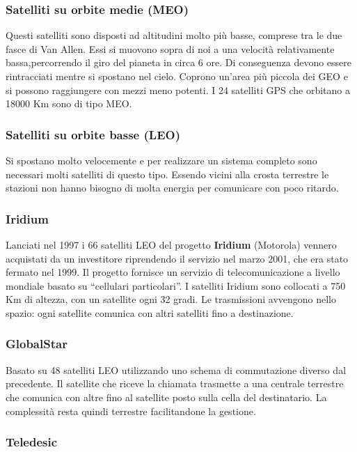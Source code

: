 \subsubsection{Satelliti su orbite medie (MEO)}

Questi satelliti sono disposti ad altitudini molto più basse, comprese tra le due fasce di Van Allen. Essi si muovono sopra di noi a una velocità relativamente bassa,percorrendo il giro del pianeta in circa 6 ore. Di conseguenza devono essere rintracciati mentre si spostano nel cielo. Coprono un'area più piccola dei GEO e si possono raggiungere con mezzi meno potenti. I 24 satelliti GPS che orbitano a 18000 Km sono di tipo MEO.

\subsubsection{Satelliti su orbite basse (LEO)}

Si spostano molto velocemente e per realizzare un sistema completo sono necessari molti satelliti di questo tipo. Essendo vicini alla crosta terrestre le stazioni non hanno bisogno di molta energia per comunicare con poco ritardo.

\subsubsection*{Iridium}					

Lanciati nel 1997 i 66 satelliti LEO del progetto \textbf{Iridium} (Motorola) vennero acquistati da un investitore riprendendo il servizio nel marzo 2001, che era stato fermato nel 1999. Il progetto fornisce un servizio di telecomunicazione a livello mondiale basato su ``cellulari particolari''. I satelliti Iridium sono collocati a 750 Km di altezza, con un satellite ogni 32 gradi. Le trasmissioni avvengono nello spazio: ogni satellite comunica con altri satelliti fino a destinazione.

\subsubsection*{GlobalStar}

Basato su 48 satelliti LEO utilizzando uno schema di commutazione diverso dal precedente. Il satellite che riceve la chiamata trasmette a una centrale terrestre che comunica con altre fino al satellite posto sulla cella del destinatario. La complessità resta quindi terrestre facilitandone la gestione.

\subsubsection*{Teledesic}

